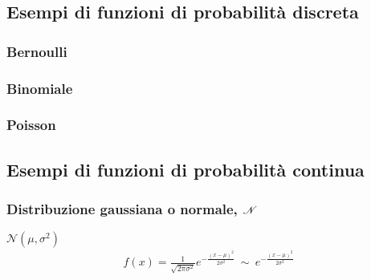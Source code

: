 \documentclass[letterpaper,10pt,italian]{jupyterBook}
\begin{document}
\subsection{Esempi di funzioni di probabilità discreta}
\label{\detokenize{ch/statistics/pfun_discrete_examples:esempi-di-funzioni-di-probabilita-discreta}}\label{\detokenize{ch/statistics/pfun_discrete_examples::doc}}

\subsubsection{Bernoulli}
\label{\detokenize{ch/statistics/pfun_discrete_examples:bernoulli}}

\subsubsection{Binomiale}
\label{\detokenize{ch/statistics/pfun_discrete_examples:binomiale}}

\subsubsection{Poisson}
\label{\detokenize{ch/statistics/pfun_discrete_examples:poisson}}
\sphinxstepscope


\subsection{Esempi di funzioni di probabilità continua}
\label{\detokenize{ch/statistics/pfun_continuous_examples:esempi-di-funzioni-di-probabilita-continua}}\label{\detokenize{ch/statistics/pfun_continuous_examples::doc}}

\subsubsection{Distribuzione gaussiana o normale, \protect\(\mathscr{N}\protect\)}
\label{\detokenize{ch/statistics/pfun_continuous_examples:distribuzione-gaussiana-o-normale-mathscr-n}}
\sphinxAtStartPar
\(\mathscr{N}(\mu, \sigma^2)\)
\begin{equation*}
\begin{split}f(x) = \frac{1}{\sqrt{2\pi\sigma^2}} e^{-\frac{(x-\mu)^2}{2\sigma^2}} \ \sim \ e^{-\frac{(x-\mu)^2}{2\sigma^2}}\end{split}
\end{equation*}
\end{document}
